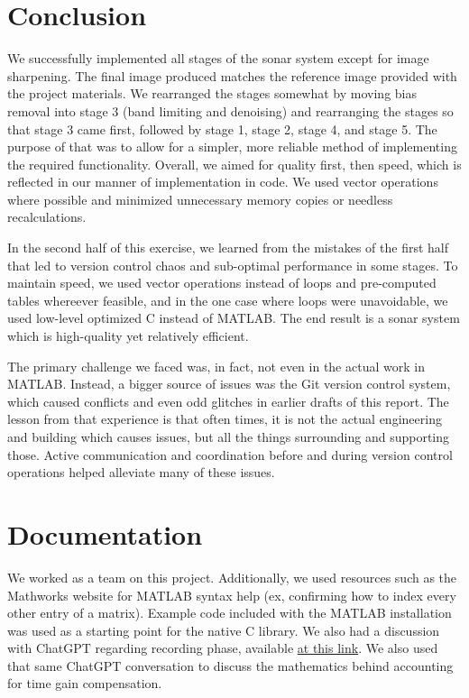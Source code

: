 
\section{Conclusion}
We successfully implemented all stages of the sonar system except for image sharpening. The final image produced 
matches the reference image provided with the project materials. We rearranged the stages somewhat by moving bias 
removal into stage 3 (band limiting and denoising) and rearranging the stages so that stage 3 came first, followed 
by stage 1, stage 2, stage 4, and stage 5. The purpose of that was to allow for a simpler, more reliable method
of implementing the required functionality. Overall, we aimed for quality first, then speed, which is reflected
in our manner of implementation in code. We used vector operations where possible and minimized unnecessary
memory copies or needless recalculations.

In the second half of this exercise, we learned from the mistakes of the first half that led to version control 
chaos and sub-optimal performance in some stages. To maintain speed, we used vector operations instead of loops 
and pre-computed tables whereever feasible, and in the one case where loops were unavoidable, we used low-level 
optimized C instead of MATLAB. The end result is a sonar system which is high-quality yet relatively efficient.

The primary challenge we faced was, in fact, not even in the actual work in \textsc{MATLAB}. Instead, a bigger source
of issues was the Git version control system, which caused conflicts and even odd glitches in earlier drafts of this 
report. The lesson from that experience is that often times, it is not the actual engineering and building which causes 
issues, but all the things surrounding and supporting those. Active communication and coordination before and during 
version control operations helped alleviate many of these issues.

\section*{Documentation}
We worked as a team on this project. Additionally, we used resources such as the Mathworks website for \textsc{MATLAB} 
syntax help (ex, confirming how to index every other entry of a matrix). Example code included with the MATLAB 
installation was used as a starting point for the native C library. We also had a discussion with ChatGPT regarding 
recording phase, available \href{https://chatgpt.com/c/673ff615-bf94-800b-a437-6f861b769c24}{at this link}. 
We also used that same ChatGPT conversation to discuss the mathematics behind accounting for time gain compensation.